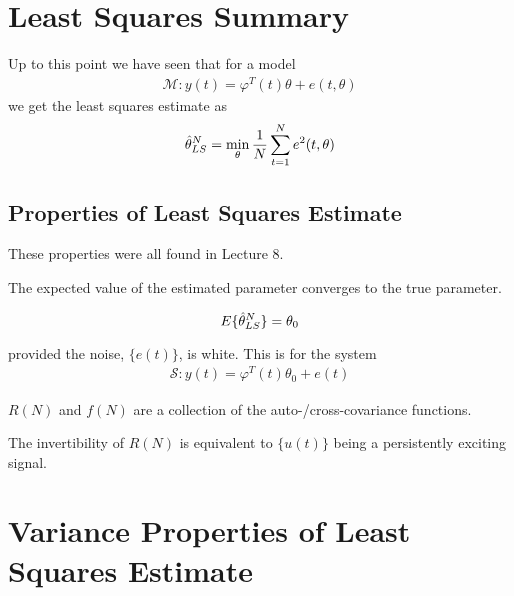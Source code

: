 \mainmatter%
\setcounter{page}{1}

\lectureseries[\course]{\course}

\date{September 24, 2009}

\setaddress%

\setcounter{lecture}{8}
\setcounter{chapter}{8}


\section{Least Squares Summary}
Up to this point we have seen that for a model
\begin{align}
\label{eq:09model}
\mathcal{M}: y(t) = \varphi^T(t)\theta + e(t,\theta)
\end{align}
we get the least squares estimate as
\begin{align}
\label{eq:lse}
\hat{\theta}_{LS}^N = \min_\theta\frac{1}{N}\sum_{t=1}^N e^2(t,\theta)
\end{align}

\subsection{Properties of Least Squares Estimate}
These properties were all found in Lecture 8.

The expected value of the estimated parameter converges to the true parameter.

\begin{equation*}
E\{\hat{\theta}_{LS}^N\} = \theta_0
\end{equation*}

provided the noise, $\{e(t)\}$, is white.
This is for the system
\begin{align}
\label{eq:09sys}
\mathcal{S}: y(t) = \varphi^T(t)\theta_0 + e(t)
\end{align}

$R(N)$ and $f(N)$ are a collection of the auto-/cross-covariance functions.

The invertibility of $R(N)$ is equivalent to $\{u(t)\}$ being a persistently exciting signal.

\section{Variance Properties of Least Squares Estimate}

